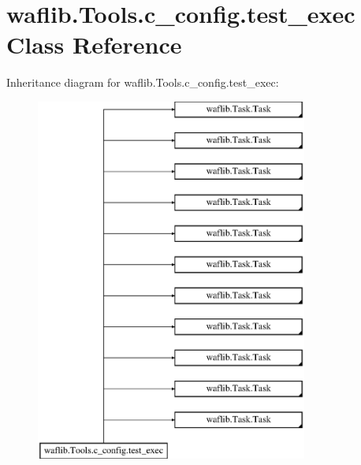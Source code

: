 \hypertarget{classwaflib_1_1_tools_1_1c__config_1_1test__exec}{}\section{waflib.\+Tools.\+c\+\_\+config.\+test\+\_\+exec Class Reference}
\label{classwaflib_1_1_tools_1_1c__config_1_1test__exec}
Inheritance diagram for waflib.\+Tools.\+c\+\_\+config.\+test\+\_\+exec\+:\begin{figure}[H]
\begin{center}
\leavevmode
\includegraphics[height=12.000000cm]{classwaflib_1_1_tools_1_1c__config_1_1test__exec}
\end{center}
\end{figure}
